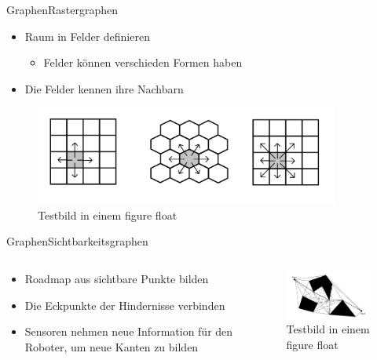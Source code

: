 \documentclass[t,aspectratio=169,dvipsnames]{beamer}
\begin{document}
\begin{frame}{Graphen}{Rastergraphen}
	\begin{itemize}
		\item Raum in Felder definieren
		\begin{itemize}
			\item Felder können verschieden Formen haben
		\end{itemize} 
		\item Die Felder kennen ihre Nachbarn
	\end{itemize}
	\begin{figure}
		\includegraphics[width=10.0cm]{images/Grid_Tiles.png}
		\caption{Testbild in einem figure float} 
	\end{figure}
\end{frame}

\begin{frame}{Graphen}{Sichtbarkeitsgraphen}
	\begin{columns}
		\begin{column}[T]{0.5\textwidth}
			\begin{itemize}
				\item Roadmap aus sichtbare Punkte bilden
				\item Die Eckpunkte der Hindernisse verbinden
				\item Sensoren nehmen neue Information für den Roboter, um neue  Kanten zu bilden
			\end{itemize}
		\end{column}
		\begin{column}[T]{0.5\textwidth}
			\begin{figure}
				\includegraphics[width=6.5cm]{images/Robot_Motion_Visibility_Graph.png}
				\caption{Testbild in einem figure float} 
			\end{figure}
		\end{column}
	\end{columns}
\end{frame}
\end{document}
